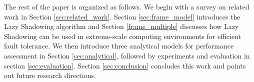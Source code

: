 The rest of the paper is organized as follows. We begin with a survey on related work in Section 
\ref{sec:related_work}. Section \ref{sec:frame_model} introduces the Lazy Shadowing algorithm and Section \ref{frame_multiple} discusses how Lazy Shadowing can be used in 
extreme-scale computing environments for efficient fault tolerance. 
We then introduce three analytical models for performance assessment
in Section \ref{sec:analytical}, 
followed by experiments and evaluation in
section \ref{sec:evaluation}. Section \ref{sec:conclusion} concludes this work and points out 
future research directions.
